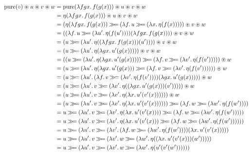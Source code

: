 \setcounter{TemporaryCounter}{\value{equation}}
\setcounter{equation}{0}
\NoChapterPrefix
\begin{align}
  \pure(\compop) \circledast u \circledast v \circledast w
  &= \pure(\lam{f g x}{f(g(x))}) \circledast u \circledast v \circledast w \\
  &= \eta(\lam{f g x}{f(g(x))}) \circledast u \circledast v \circledast w \\
  &= (\eta(\lam{f g x}{f(g(x))}) \hsbind (\lam{f}{u \hsbind (\lam{x}{\eta(f(x))})})) \circledast v \circledast w \\
  &= ((\lam{f}{u \hsbind (\lam{u'}{\eta(f(u'))})})(\lam{f g x}{f(g(x))})) \circledast v \circledast w \\
  &= (u \hsbind (\lam{u'}{\eta((\lam{f g x}{f(g(x))})(u'))})) \circledast v \circledast w \\
  &= (u \hsbind (\lam{u'}{\eta(\lam{g x}{u'(g(x))})})) \circledast v \circledast w \\
  &= ((u \hsbind (\lam{u'}{\eta(\lam{g x}{u'(g(x))})})) \hsbind (\lam{f}{v \hsbind (\lam{v'}{\eta(f(v'))})})) \circledast w \\
  &= (u \hsbind (\lam{u'}{\eta(\lam{g x}{u'(g(x))}) \hsbind (\lam{f}{v \hsbind (\lam{v'}{\eta(f(v'))})})})) \circledast w \\
  &= (u \hsbind (\lam{u'}{(\lam{f}{v \hsbind (\lam{v'}{\eta(f(v'))})})(\lam{g x}{u'(g(x))})})) \circledast w \\
  &= (u \hsbind (\lam{u'}{v \hsbind (\lam{v'}{\eta((\lam{g x}{u'(g(x))})(v'))})})) \circledast w \\
  &= (u \hsbind (\lam{u'}{v \hsbind (\lam{v'}{\eta(\lam{x}{u'(v'(x))})})})) \circledast w \\
  &= (u \hsbind (\lam{u'}{v \hsbind (\lam{v'}{\eta(\lam{x}{u'(v'(x))})})})) \hsbind (\lam{f}{w \hsbind (\lam{w'}{\eta(f(w'))})}) \\
  &= u \hsbind (\lam{u'}{v \hsbind (\lam{v'}{\eta(\lam{x}{u'(v'(x))})}) \hsbind (\lam{f}{w \hsbind (\lam{w'}{\eta(f(w'))})})}) \\
  &= u \hsbind (\lam{u'}{v \hsbind (\lam{v'}{\eta(\lam{x}{u'(v'(x))}) \hsbind (\lam{f}{w \hsbind (\lam{w'}{\eta(f(w'))})})})}) \\
  &= u \hsbind (\lam{u'}{v \hsbind (\lam{v'}{(\lam{f}{w \hsbind (\lam{w'}{\eta(f(w'))})})(\lam{x}{u'(v'(x))})})}) \\
  &= u \hsbind (\lam{u'}{v \hsbind (\lam{v'}{w \hsbind (\lam{w'}{\eta((\lam{x}{u'(v'(x))})(w'))})})}) \\
  &= u \hsbind (\lam{u'}{v \hsbind (\lam{v'}{w \hsbind (\lam{w'}{\eta(u'(v'(w')))})})}) \\

\end{align}
